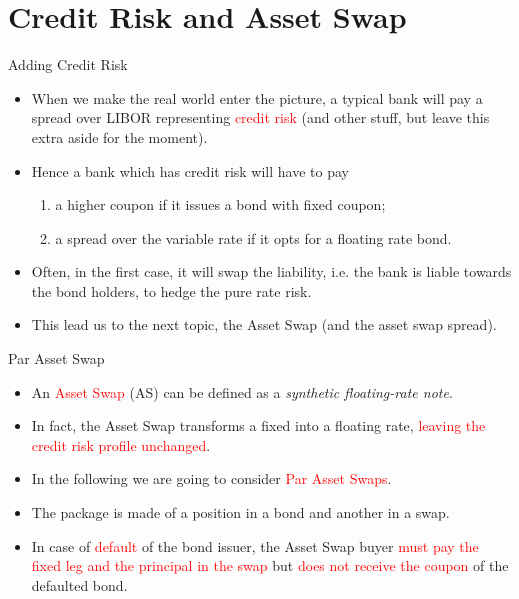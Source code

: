 \documentclass{beamer}
\begin{document}
\section{Credit Risk and Asset Swap}
\begin{frame}{Adding Credit Risk}
	\begin{itemize}
		\item When we make the real world enter the picture, a typical bank will pay a spread over LIBOR representing \textcolor{red}{credit risk} (and other stuff, but leave this extra aside for the moment). 
		\item<2-> Hence a bank which has credit risk will have to pay
		\begin{enumerate}
			\item a higher coupon if it issues a bond with fixed coupon;
			\item a spread over the variable rate if it opts for a floating rate bond.
		\end{enumerate}
		\item<3-> Often, in the first case, it will swap the liability, i.e. the bank is liable towards the bond holders, to hedge the pure rate risk. 
		\item<4-> This lead us to the next topic, the Asset Swap (and the asset swap spread).
	\end{itemize}
\end{frame}

\begin{frame}{Par Asset Swap}
	\begin{itemize}
		\item<1-> An \textcolor{red}{Asset Swap} (AS) can be defined as a \emph{synthetic floating-rate note}.
		\item In fact, the Asset Swap transforms a fixed into a floating rate, \textcolor{red}{leaving the credit risk profile unchanged}.
		\item<1-> In the following we are going to consider \textcolor{red}{Par Asset Swaps}. 
		\item<2-> The package is made of a position in a bond and another in a swap.
		\item<3-> In case of \textcolor{red}{default} of the bond issuer, the Asset Swap buyer \textcolor{red}{must pay the fixed leg and the principal in the swap} but \textcolor{red}{does not receive the coupon} of the defaulted bond. 
	\end{itemize}
\end{frame}
\end{document}
